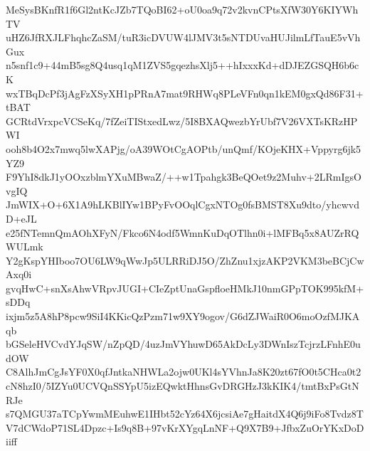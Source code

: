 MeSysBKnfR1f6Gl2ntKcJZb7TQoBI62+oU0oa9q72v2kvnCPtsXfW30Y6KIYWhTV
uHZ6JfRXJLFhqhcZaSM/tuR3icDVUW4lJMV3t5sNTDUvaHUJilmLfTauE5vVhGux
n5snf1c9+44mB5sg8Q4usq1qM1ZVS5gqezhsXlj5++hIxxxKd+dDJEZGSQH6b6cK
wxTBqDcPf3jAgFzXSyXH1pPRnA7mat9RHWq8PLeVFn0qn1kEM0gxQd86F31+tBAT
GCRtdVrxpcVCSeKq/7fZeiTIStxedLwz/5I8BXAQwezbYrUbf7V26VXTsKRzHPWI
ooh8b4O2x7mwq5lwXAPjg/oA39WOtCgAOPtb/unQmf/KOjeKHX+Vppyrg6jk5YZ9
F9YhI8dkJ1yOOxzblmYXuMBwaZ/++w1Tpahgk3BeQOet9z2Muhv+2LRmIgsOvgIQ
JmWIX+O+6X1A9hLKBlIYw1BPyFvOOqlCgxNTOg0fsBMST8Xu9dto/yhcwvdD+eJL
e25fNTemnQmAOhXFyN/Fkco6N4odf5WmnKuDqOTlhn0i+lMFBq5x8AUZrRQWULmk
Y2gKspYHIboo7OU6LW9qWwJp5ULRRiDJ5O/ZhZnu1xjzAKP2VKM3beBCjCwAxq0i
gvqHwC+snXsAhwVRpvJUGI+CIeZptUnaGspfloeHMkJ10nmGPpTOK995kfM+sDDq
ixjm5z5A8hP8pcw9SiI4KKicQzPzm71w9XY9ogov/G6dZJWaiR0O6moOzfMJKAqb
bGSeleHVCvdYJqSW/nZpQD/4uzJmVYhuwD65AkDcLy3DWnIszTcjrzLFnhE0udOW
C8AlhJmCgJsYF0X0qfJntkaNHWLa2ojw0UKl4sYVhnJa8K20zt67fO0t5CHca0t2
cN8hzI0/5IZYu0UCVQnSSYpU5izEQwktHhnsGvDRGHzJ3kKIK4/tmtBxPsGtNRJe
s7QMGU37aTCpYwmMEuhwE1IHbt52cYz64X6jcsiAe7gHaitdX4Q6j9iFo8Tvdz8T
V7dCWdoP71SL4Dpzc+Is9q8B+97vKrXYgqLnNF+Q9X7B9+JfbxZuOrYKxDoDiiff
